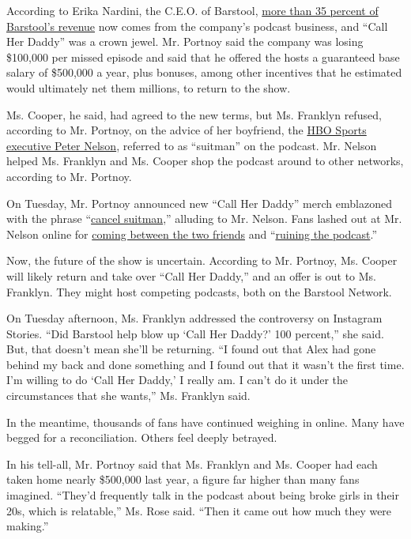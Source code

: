 According to Erika Nardini, the C.E.O. of Barstool,
\href{https://variety.com/2019/digital/news/barstool-sports-podcast-revenue-1203305912/}{more
than 35 percent of Barstool's revenue} now comes from the company's
podcast business, and ``Call Her Daddy'' was a crown jewel. Mr. Portnoy
said the company was losing \$100,000 per missed episode and said that
he offered the hosts a guaranteed base salary of \$500,000 a year, plus
bonuses, among other incentives that he estimated would ultimately net
them millions, to return to the show.

Ms. Cooper, he said, had agreed to the new terms, but Ms. Franklyn
refused, according to Mr. Portnoy, on the advice of her boyfriend, the
\href{https://nypost.com/2020/05/19/what-to-know-about-peter-nelson-and-call-her-daddy-drama/}{HBO
Sports executive Peter Nelson}, referred to as ``suitman'' on the
podcast. Mr. Nelson helped Ms. Franklyn and Ms. Cooper shop the podcast
around to other networks, according to Mr. Portnoy.

On Tuesday, Mr. Portnoy announced new ``Call Her Daddy'' merch
emblazoned with the phrase
``\href{https://twitter.com/stoolpresidente/status/1262390184613740544}{cancel
suitman},'' alluding to Mr. Nelson. Fans lashed out at Mr. Nelson online
for
\href{https://twitter.com/knicks_tape99/status/1262412507060338689}{coming
between the two friends} and
``\href{https://twitter.com/realitykiwi/status/1262209743478808576}{ruining
the podcast}.''

Now, the future of the show is uncertain. According to Mr. Portnoy, Ms.
Cooper will likely return and take over ``Call Her Daddy,'' and an offer
is out to Ms. Franklyn. They might host competing podcasts, both on the
Barstool Network.

On Tuesday afternoon, Ms. Franklyn addressed the controversy on
Instagram Stories. ``Did Barstool help blow up `Call Her Daddy?' 100
percent,'' she said. But, that doesn't mean she'll be returning. ``I
found out that Alex had gone behind my back and done something and I
found out that it wasn't the first time. I'm willing to do `Call Her
Daddy,' I really am. I can't do it under the circumstances that she
wants,'' Ms. Franklyn said.

In the meantime, thousands of fans have continued weighing in online.
Many have begged for a reconciliation. Others feel deeply betrayed.

In his tell-all, Mr. Portnoy said that Ms. Franklyn and Ms. Cooper had
each taken home nearly \$500,000 last year, a figure far higher than
many fans imagined. ``They'd frequently talk in the podcast about being
broke girls in their 20s, which is relatable,'' Ms. Rose said. ``Then it
came out how much they were making.''

